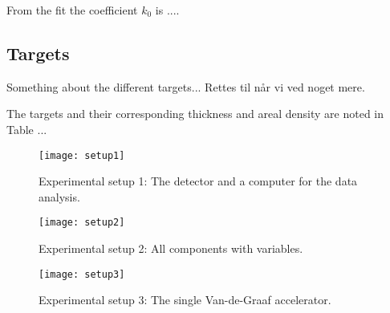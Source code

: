 From the fit the coefficient $k_0$ is .... 



\subsection{Targets}
Something about the different targets... Rettes til når vi ved noget mere.

The targets and their corresponding thickness and areal density are noted in Table ...





\begin{figure}[h]
\centering
\texttt{[image: setup1]}
\caption{Experimental setup 1: The detector and a computer for the data
analysis.}
\label{fig_setup1}
\end{figure}

\begin{figure}[h]
\centering
\texttt{[image: setup2]}
\caption{Experimental setup 2: All components with variables.}
\label{fig_setup2}
\end{figure}

\begin{figure}[h]
\centering
\texttt{[image: setup3]}
\caption{Experimental setup 3: The single Van-de-Graaf accelerator.}
\label{fig_setup3}
\end{figure}

